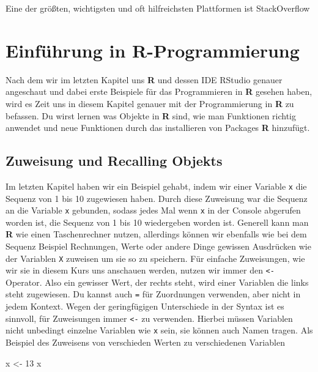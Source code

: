 \documentclass[
]{book}
\newenvironment{Shaded}{\begin{snugshade}}{\end{snugshade}}
\newcommand{\DecValTok}[1]{\textcolor[rgb]{0.00,0.00,0.81}{#1}}
\newcommand{\NormalTok}[1]{#1}
\newcommand{\StringTok}[1]{\textcolor[rgb]{0.31,0.60,0.02}{#1}}
\begin{document}
Eine der größten, wichtigsten und oft hilfreichsten Plattformen ist StackOverflow

\hypertarget{kapitel3}{%
\chapter{\texorpdfstring{Einführung in \textbf{R}-Programmierung}{Einführung in R-Programmierung}}\label{kapitel3}}

Nach dem wir im letzten Kapitel uns \textbf{R} und dessen IDE RStudio genauer angeschaut und dabei erste Beispiele für das Programmieren in \textbf{R} gesehen haben, wird es Zeit uns in diesem Kapitel genauer mit der Programmierung in \textbf{R} zu befassen.
Du wirst lernen was Objekte in \textbf{R} sind, wie man Funktionen richtig anwendet und neue Funktionen durch das installieren von Packages \textbf{R} hinzufügt.

\hypertarget{zuweisung-und-recalling-objekts}{%
\section*{Zuweisung und Recalling Objekts}\label{zuweisung-und-recalling-objekts}}

Im letzten Kapitel haben wir ein Beispiel gehabt, indem wir einer Variable \texttt{x} die Sequenz von 1 bis 10 zugewiesen haben.
Durch diese Zuweisung war die Sequenz an die Variable \texttt{x} gebunden, sodass jedes Mal wenn \texttt{x} in der Console abgerufen worden ist, die Sequenz von 1 bis 10 wiedergeben worden ist.
Generell kann man \textbf{R} wie einen Taschenrechner nutzen, allerdings können wir ebenfalls wie bei dem Sequenz Beispiel Rechnungen, Werte oder andere Dinge gewissen Ausdrücken wie der Variablen \texttt{X} zuweisen um sie so zu speichern.
Für einfache Zuweisungen, wie wir sie in diesem Kurs uns anschauen werden, nutzen wir immer den \texttt{\textless{}-} Operator.
Also ein gewisser Wert, der rechts steht, wird einer Variablen die links steht zugewiesen.
Du kannst auch \texttt{=} für Zuordnungen verwenden, aber nicht in jedem Kontext.
Wegen der geringfügigen Unterschiede in der Syntax ist es sinnvoll, für Zuweisungen immer \texttt{\textless{}-} zu verwenden.
Hierbei müssen Variablen nicht unbedingt einzelne Variablen wie \texttt{x} sein, sie können auch Namen tragen.
Als Beispiel des Zuweisens von verschieden Werten zu verschiedenen Variablen

\begin{Shaded}
\begin{Highlighting}[]
\NormalTok{  x <-}\StringTok{ }\DecValTok{13}
\NormalTok{  x}
\end{Highlighting}
\end{Shaded}
\end{document}
